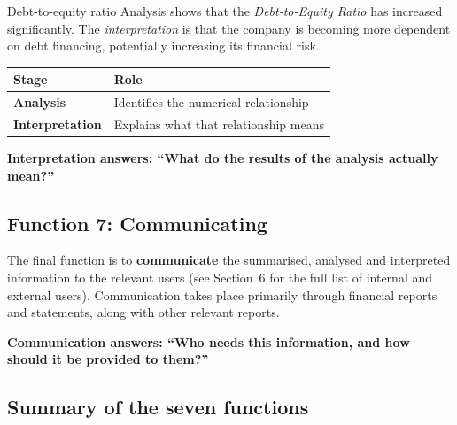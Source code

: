\documentclass[11pt,a4paper]{article}
\begin{document}
\begin{exbox}{Debt-to-equity ratio}
Analysis shows that the \emph{Debt-to-Equity Ratio} has increased significantly. The
\emph{interpretation} is that the company is becoming more dependent on debt financing,
potentially increasing its financial risk.
\end{exbox}

\begin{center}
\small
\begin{tabularx}{\textwidth}{@{}l Y@{}}
\toprule
{}\textbf{Stage} & \textbf{Role}\\
\midrule
\textbf{Analysis} & Identifies the numerical relationship\\
\textbf{Interpretation} & Explains what that relationship means\\
\bottomrule
\end{tabularx}
\end{center}

\begin{keybox}
\textbf{Interpretation answers: ``What do the results of the analysis actually mean?''}
\end{keybox}

\subsection{Function 7: Communicating}

The final function is to \textbf{communicate} the summarised, analysed and interpreted
information to the relevant users (see Section~6 for the full list of internal and external
users). Communication takes place primarily through financial reports and statements, along
with other relevant reports.

\begin{keybox}
\textbf{Communication answers: ``Who needs this information, and how should it be provided to them?''}
\end{keybox}

\subsection{Summary of the seven functions}
\end{document}
